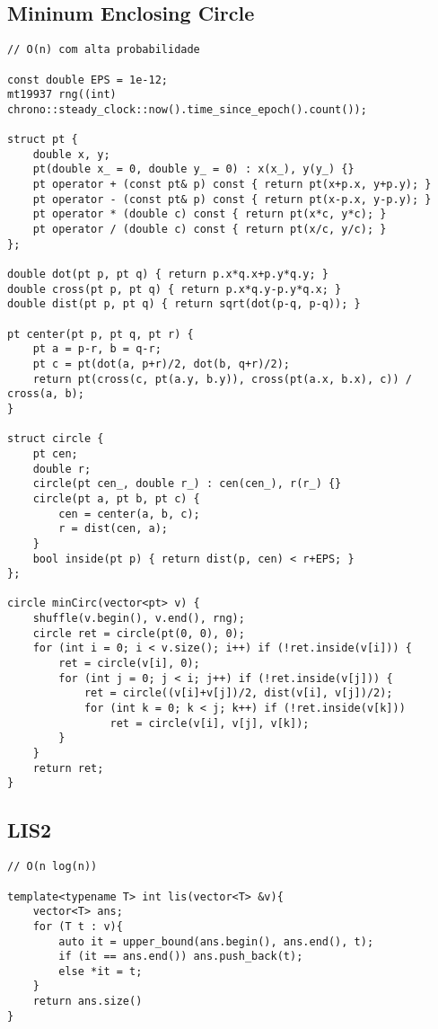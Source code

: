 \documentclass[12pt, a4paper, twoside]{article}
\begin{document}
\subsection{Mininum Enclosing Circle}
\begin{lstlisting}
// O(n) com alta probabilidade

const double EPS = 1e-12;
mt19937 rng((int) chrono::steady_clock::now().time_since_epoch().count());

struct pt {
	double x, y;
	pt(double x_ = 0, double y_ = 0) : x(x_), y(y_) {}
	pt operator + (const pt& p) const { return pt(x+p.x, y+p.y); }
	pt operator - (const pt& p) const { return pt(x-p.x, y-p.y); }
	pt operator * (double c) const { return pt(x*c, y*c); }
	pt operator / (double c) const { return pt(x/c, y/c); }
};

double dot(pt p, pt q) { return p.x*q.x+p.y*q.y; }
double cross(pt p, pt q) { return p.x*q.y-p.y*q.x; }
double dist(pt p, pt q) { return sqrt(dot(p-q, p-q)); }

pt center(pt p, pt q, pt r) {
	pt a = p-r, b = q-r;
	pt c = pt(dot(a, p+r)/2, dot(b, q+r)/2);
	return pt(cross(c, pt(a.y, b.y)), cross(pt(a.x, b.x), c)) / cross(a, b);
}

struct circle {
	pt cen;
	double r;
	circle(pt cen_, double r_) : cen(cen_), r(r_) {}
	circle(pt a, pt b, pt c) {
		cen = center(a, b, c);
		r = dist(cen, a);
	}
	bool inside(pt p) { return dist(p, cen) < r+EPS; }
};

circle minCirc(vector<pt> v) {
	shuffle(v.begin(), v.end(), rng);
	circle ret = circle(pt(0, 0), 0);
	for (int i = 0; i < v.size(); i++) if (!ret.inside(v[i])) {
		ret = circle(v[i], 0);
		for (int j = 0; j < i; j++) if (!ret.inside(v[j])) {
			ret = circle((v[i]+v[j])/2, dist(v[i], v[j])/2);
			for (int k = 0; k < j; k++) if (!ret.inside(v[k]))
				ret = circle(v[i], v[j], v[k]);
		}
	}
	return ret;
}

\end{lstlisting}

\subsection{LIS2}
\begin{lstlisting}
// O(n log(n))

template<typename T> int lis(vector<T> &v){
	vector<T> ans;
	for (T t : v){
		auto it = upper_bound(ans.begin(), ans.end(), t);
		if (it == ans.end()) ans.push_back(t);
		else *it = t;
	}
	return ans.size()
}
\end{lstlisting}
\end{document}
